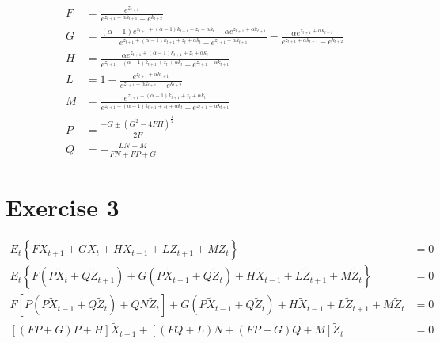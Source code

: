 \documentclass[11pt]{article}
\numberwithin{equation}{section}
\theoremstyle{plain}
\theoremstyle{definition}
\newcommand\parens[1]{\left( #1 \right)}
\newcommand\squares[1]{\left[ #1 \right]}
\newcommand{\1}{\mathbbm 1}
\def\a{\alpha}
\begin{document}
\begin{align*}
F &=  \frac{e^{z_{t+1}}}{e^{z_{t+1} + \a k_{t+1}} - e^{k_{t+2}}} \\
G &= \frac{(\a -1)  e^{z_{t+1} + (\a - 1)k_{t+1} + z_t + \a k_t} - \a e^{z_{t+1} + \a k_{t+1}}}{ e^{z_{t+1} + (\a - 1)k_{t+1} + z_t + \a k_t} - e^{z_{t+1} + \a k_{t+1}}} - \frac{\a e^{z_{t+1} + \a k_{t+1}}}{e^{z_{t+1} + \a k_{t+1}} - e^{k_{t+2}}} \\
H &= \frac{\a  e^{z_{t+1} + (\a - 1)k_{t+1} + z_t + \a k_t}}{ e^{z_{t+1} + (\a - 1)k_{t+1} + z_t + \a k_t} - e^{z_{t+1} + \a k_{t+1}}} \\
L &= 1 -  \frac{e^{z_{t+1} + \a k_{t+1}}}{e^{z_{t+1} + \a k_{t+1}} - e^{k_{t+2}}} \\
M &=  \frac{ e^{z_{t+1} + (\a - 1)k_{t+1} + z_t + \a k_t}}{ e^{z_{t+1} + (\a - 1)k_{t+1} + z_t + \a k_t} -  e^{z_{t+1} + \a k_{t+1}}} \\
P &= \frac{-G \pm (G^2 - 4FH)^{\frac{1}{2}}}{2F} \\
Q &= - \frac{LN + M}{FN + FP + G}
\end{align*}




\section*{Exercise 3}

\begin{align}
E_{t}\left\{F \tilde{X}_{t+1}+G \tilde{X}_{t}+H \tilde{X}_{t-1}+L \tilde{Z}_{t+1}+M \tilde{Z}_{t}\right\} &= 0\\
E_{t}\left\{F \parens{P \tilde{X}_t + Q \tilde{Z}_{t+1}} +G \parens{P \tilde{X}_{t-1} + Q \tilde{Z}_t}+H \tilde{X}_{t-1}+L \tilde{Z}_{t+1}+M \tilde{Z}_{t}\right\} &= 0 \\
F \squares{P \parens{P \tilde{X}_{t-1} + Q \tilde{Z}_t} + Q N \tilde{Z}_{t}} +G \parens{P \tilde{X}_{t-1} + Q \tilde{Z}_t}+H \tilde{X}_{t-1}+L \tilde{Z}_{t+1}+M \tilde{Z}_{t} &= 0 \\
[(F P+G) P+H] \tilde{X}_{t-1}+[(F Q+L) N+(F P+G) Q+M] \tilde{Z}_{t}&=0
\end{align}


\end{document}
